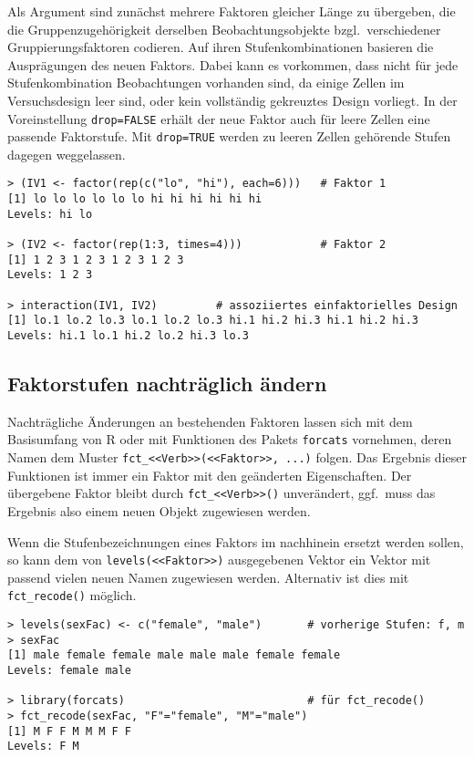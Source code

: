 Als Argument sind zunächst mehrere Faktoren gleicher Länge zu übergeben, die die Gruppenzugehörigkeit derselben Beobachtungsobjekte bzgl.\ verschiedener Gruppierungsfaktoren codieren. Auf ihren Stufenkombinationen basieren die Ausprägungen des neuen Faktors. Dabei kann es vorkommen, dass nicht für jede Stufenkombination Beobachtungen vorhanden sind, da einige Zellen im Versuchsdesign leer sind, oder kein vollständig gekreuztes Design vorliegt. In der Voreinstellung \lstinline!drop=FALSE! erhält der neue Faktor auch für leere Zellen eine passende Faktorstufe. Mit \lstinline!drop=TRUE! werden zu leeren Zellen gehörende Stufen dagegen weggelassen.
\begin{lstlisting}
> (IV1 <- factor(rep(c("lo", "hi"), each=6)))   # Faktor 1
[1] lo lo lo lo lo lo hi hi hi hi hi hi
Levels: hi lo

> (IV2 <- factor(rep(1:3, times=4)))            # Faktor 2
[1] 1 2 3 1 2 3 1 2 3 1 2 3
Levels: 1 2 3

> interaction(IV1, IV2)         # assoziiertes einfaktorielles Design
[1] lo.1 lo.2 lo.3 lo.1 lo.2 lo.3 hi.1 hi.2 hi.3 hi.1 hi.2 hi.3
Levels: hi.1 lo.1 hi.2 lo.2 hi.3 lo.3
\end{lstlisting}

\subsection{Faktorstufen nachträglich ändern}
\label{sec:facChangeLevels}

Nachträgliche Änderungen an bestehenden Faktoren lassen sich mit dem Basisumfang von R oder mit Funktionen des Pakets \lstinline!forcats! \cite{Wickham2019} vornehmen, deren Namen dem Muster \lstinline!fct_<<Verb>>(<<Faktor>>, ...)! folgen. Das Ergebnis dieser Funktionen ist immer ein Faktor mit den geänderten Eigenschaften. Der übergebene Faktor bleibt durch \lstinline!fct_<<Verb>>()! unverändert, ggf.\ muss das Ergebnis also einem neuen Objekt zugewiesen werden.

Wenn die Stufenbezeichnungen eines Faktors im nachhinein ersetzt werden sollen, so kann dem von \lstinline!levels(<<Faktor>>)! ausgegebenen Vektor ein Vektor mit passend vielen neuen Namen zugewiesen werden. Alternativ ist dies mit \lstinline!fct_recode()! möglich.
\begin{lstlisting}
> levels(sexFac) <- c("female", "male")       # vorherige Stufen: f, m
> sexFac
[1] male female female male male male female female
Levels: female male

> library(forcats)                            # für fct_recode()
> fct_recode(sexFac, "F"="female", "M"="male")
[1] M F F M M M F F
Levels: F M
\end{lstlisting}

